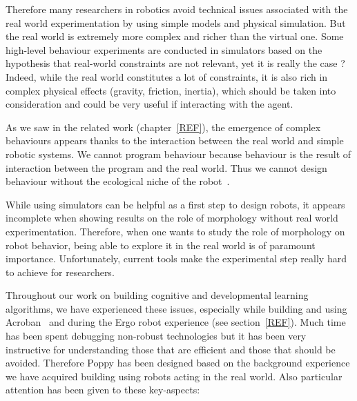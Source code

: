 Therefore many researchers in robotics avoid technical issues associated with the real world experimentation by using simple models and physical simulation. But the real world is extremely more complex and richer than the virtual one.
Some high-level behaviour experiments are conducted in simulators based on the hypothesis that real-world constraints are not relevant, yet it is really the case ?
Indeed, while the real world constitutes a lot of constraints, it is also rich in complex physical effects (gravity, friction, inertia), which should be taken into consideration and could be very useful if interacting with the agent.

As we saw in the related work (chapter~\ref{REF}), the emergence of complex behaviours appears thanks to the interaction between the real world and simple robotic systems. We cannot program behaviour because behaviour is the result of interaction  between the program and the real world. Thus we cannot design behaviour without the ecological niche of the robot~\parencite{Steels1991emergence}.

While using simulators can be helpful as a first step to design robots, it appears incomplete when showing results on the role of morphology without real world experimentation.
Therefore, when one wants to study the role of morphology on robot behavior, being able to explore it in the real world is of paramount importance. Unfortunately, current tools make the experimental step really hard to achieve for researchers.

Throughout our work on building cognitive and developmental learning algorithms, we have experienced these issues, especially while building and using Acroban~\parencite{Ly2010} and during the Ergo robot experience (see section~\ref{REF}). Much time has been spent debugging non-robust technologies but it has been very instructive for understanding those that are efficient and those that should be avoided.
Therefore Poppy has been designed based on the background experience we have acquired building using robots acting in the real world. Also particular attention has been given to these key-aspects:

